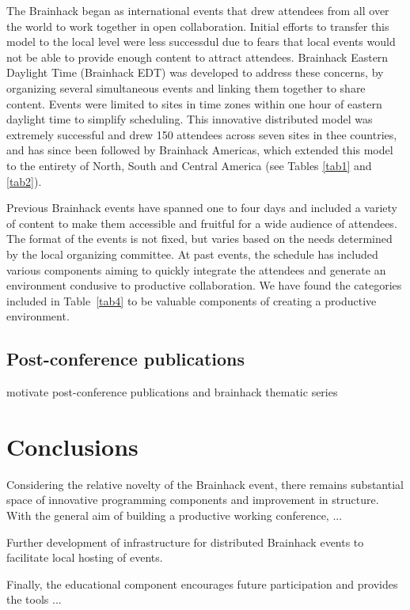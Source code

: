 \documentclass[11pt]{bmc_article_s50}
\begin{document}
The Brainhack began as international events that drew attendees from all over the world to work together in open collaboration. Initial efforts to transfer this model to the local level were less successdul due to fears that local events would not be able to provide enough content to attract attendees. Brainhack Eastern Daylight Time (Brainhack EDT) was developed to address these concerns, by organizing several simultaneous events and linking them together to share content. Events were limited to sites in time zones within one hour of eastern daylight time to simplify scheduling. This innovative distributed model was extremely successful and drew 150 attendees across seven sites in thee countries, and has since been followed by Brainhack Americas, which extended this model to the entirety of North, South and Central America (see Tables \ref{tab1} and \ref{tab2}).

Previous Brainhack events have spanned one to four days and included a variety of content to make them accessible and fruitful for a wide audience of attendees. The format of the events is not fixed, but varies based on the needs determined by the local organizing committee. At past events, the schedule has included various components aiming to quickly integrate the attendees and generate an environment condusive to productive collaboration. We have found the  categories included in Table~\ref{tab4} to be valuable components of creating a productive environment.

\subsection{Post-conference publications}\label{post-conference-publications}

motivate post-conference publications and brainhack thematic series


\section{Conclusions}\label{conclusions}

Considering the relative novelty of the Brainhack event, there remains substantial space of innovative programming components and improvement in structure. With the general aim of building a productive working conference, ...

Further development of infrastructure for distributed Brainhack events to facilitate local hosting of events. 

Finally, the educational component encourages future participation and provides the tools ...
\end{document}
